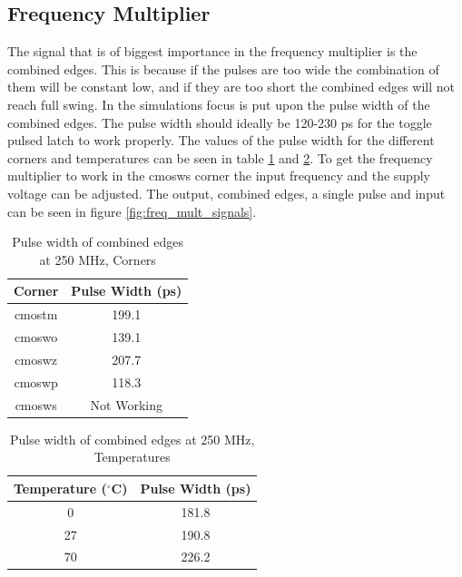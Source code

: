 \documentclass[a4paper,12pt]{article} \usepackage{graphicx}
\newcommand{\degree}{\ensuremath{^\circ}}
\begin{document}
\subsection{Frequency Multiplier}
The signal that is of biggest importance in the frequency multiplier is the
combined edges. This is because if the pulses are too wide the combination of
them will be constant low, and if they are too short the combined edges will not
reach full swing. In the simulations focus is put upon the pulse width of the
combined edges. The pulse width should ideally be 120-230 ps for the toggle
pulsed latch to work properly. The values of the pulse width for the
different corners and
temperatures can be seen in table \ref{tab:pulsewidth_corn} and
\ref{tab:pulsewidth_temp}. To get the frequency multiplier to work in the
cmosws corner the input frequency and the supply voltage can be adjusted.
The output, combined edges, a single pulse and input can be seen in figure
\ref{fig:freq_mult_signals}.
\begin{table}[h]
        \centering
        \begin{tabular}{|c|c|}
                \hline
                \textbf{Corner} & \textbf{Pulse Width (ps)} \\
                \hline
                cmostm & 199.1 \\
                cmoswo & 139.1 \\
                cmoswz & 207.7 \\
                cmoswp & 118.3 \\
                cmosws & Not Working \\
                \hline
        \end{tabular}
        \caption{Pulse width of combined edges at 250 MHz, Corners}
        \label{tab:pulsewidth_corn}
\end{table}

\begin{table}
        \centering
        \begin{tabular}{|c|c|}
                \hline
                \textbf{Temperature ($\degree$C)} & \textbf{Pulse Width (ps)} \\
                \hline
                0 & 181.8 \\
                27 & 190.8 \\
                70 & 226.2 \\
                \hline
        \end{tabular}
        \caption{Pulse width of combined edges at 250 MHz, Temperatures}
        \label{tab:pulsewidth_temp}
\end{table}
\end{document}
